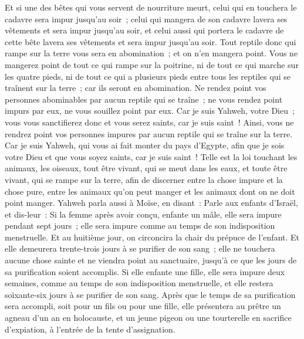 \begin{multicols}{2}
Et si une des bêtes qui vous servent de nourriture meurt, celui qui en touchera le cadavre sera impur jusqu'au soir~;
celui qui mangera de son cadavre lavera ses vêtements et sera impur jusqu'au soir, et celui aussi qui portera le cadavre de cette bête lavera ses vêtements et sera impur jusqu'au soir.
Tout reptile donc qui rampe sur la terre vous sera en abomination~; et on n'en mangera point.
Vous ne mangerez point de tout ce qui rampe sur la poitrine, ni de tout ce qui marche sur les quatre pieds, ni de tout ce qui a plusieurs pieds entre tous les reptiles qui se traînent sur la terre~; car ils seront en abomination.
Ne rendez point vos personnes abominables par aucun reptile qui se traîne~; ne vous rendez point impurs par eux, ne vous souillez point par eux.
Car je suis Yahweh, votre Dieu~; vous vous sanctifierez donc et vous serez saints, car je suis saint~! Ainsi, vous ne rendrez point vos personnes impures par aucun reptile qui se traîne sur la terre.
Car je suis Yahweh, qui vous ai fait monter du pays d'Egypte, afin que je sois votre Dieu et que vous soyez saints, car je suis saint~!
Telle est la loi touchant les animaux, les oiseaux, tout être vivant, qui se meut dans les eaux, et toute être vivant, qui se rampe sur la terre,
afin de discerner entre la chose impure et la chose pure, entre les animaux qu'on peut manger et les animaux dont on ne doit point manger.
\VerseOne{}Yahweh parla aussi à Moïse, en disant~:
Parle aux enfants d'Israël, et dis-leur~: Si la femme après avoir conçu, enfante un mâle, elle sera impure pendant sept jours~; elle sera impure comme au temps de son indisposition menstruelle.
Et au huitième jour, on circoncira la chair du prépuce de l'enfant.
Et elle demeurera trente-trois jours à se purifier de son sang~; elle ne touchera aucune chose sainte et ne viendra point au sanctuaire, jusqu'à ce que les jours de sa purification soient accomplis.
Si elle enfante une fille, elle sera impure deux semaines, comme au temps de son indisposition menstruelle, et elle restera soixante-six jours à se purifier de son sang.
Après que le temps de sa purification sera accompli, soit pour un fils ou pour une fille, elle présentera au prêtre un agneau d'un an en holocauste, et un jeune pigeon ou une tourterelle en sacrifice d'expiation, à l'entrée de la tente d'assignation.

\end{multicols}
